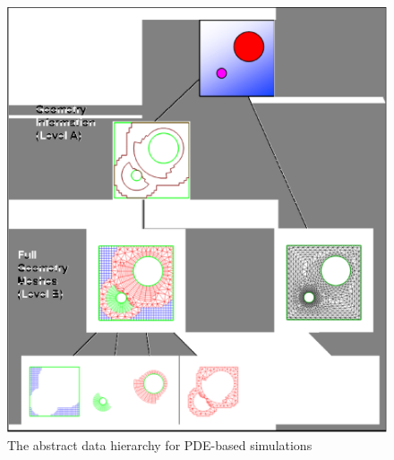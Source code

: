 \documentclass{article}
\begin{document}
\begin{figure}[htbp]
\begin{center}
\includegraphics[bb = 0 0 728 815, scale=0.23]{figures/iBase-fig1.eps}
\caption{The abstract data hierarchy for PDE-based 
simulations}\label{fig1}
\end{center}
\end{figure}
\end{document}
